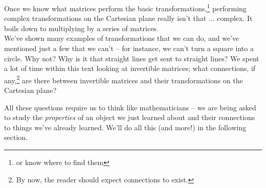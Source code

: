Once we know what matrices perform the basic transformations,\footnote{or know where to find them} performing complex transformations on the Cartesian plane really isn't that $\ldots$ complex. It boils down to multiplying by a series of matrices. \\

We've shown many examples of transformations that we can do, and we've mentioned just a few that we can't -- for instance, we can't turn a square into a circle. Why not? Why is it that straight lines get sent to straight lines? We spent a lot of time within this text looking at invertible matrices; what connections, if any,\footnote{By now, the reader should expect connections to exist.} are there between invertible matrices and their transformations on the Cartesian plane?

All these questions require us to think like mathematicians -- we are being asked to study the \textit{properties} of an object we just learned about and their connections to things we've already learned. We'll do all this (and more!) in the following section.\\




